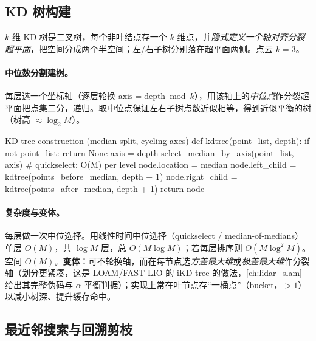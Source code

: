 \subsection{KD 树构建}
\label{sec:pc-kdbuild}

\begin{definition}[KD 树]\label{def:pc-kdtree}
$k$ 维 KD 树是二叉树，每个非叶结点存一个 $k$ 维点，并\emph{隐式定义一个轴对齐分裂超平面}，把空间分成两个半空间；左/右子树分别落在超平面两侧。点云 $k=3$。
\end{definition}

\paragraph{中位数分割建树。}
每层选一个坐标轴（逐层轮换 $\text{axis}=\text{depth}\bmod k$），用该轴上的\emph{中位点}作分裂超平面把点集二分，递归。取中位点保证左右子树点数近似相等，得到近似平衡的树（树高 $\approx\log_2 M$）\cite{bentley1975kdtree}。

\begin{algo}[KD 树建树]\label{alg:pc-kdbuild}
\begin{codebox}[Python]{KD-tree construction (median split, cycling axes)}
def kdtree(point_list, depth):
    if not point_list:
        return None
    axis = depth %
    select_median_by_axis(point_list, axis)   # quickselect: O(M) per level
    node.location   = median
    node.left_child  = kdtree(points_before_median, depth + 1)
    node.right_child = kdtree(points_after_median,  depth + 1)
    return node
\end{codebox}
\end{algo}

\paragraph{复杂度与变体。}
每层做一次中位选择。用线性时间中位选择（quickselect / median-of-medians）单层 $O(M)$，共 $\log M$ 层，总 \textbf{$O(M\log M)$}；若每层排序则 $O(M\log^2 M)$。空间 $O(M)$。\textbf{变体}：可不轮换轴，而在每节点选\emph{方差最大维}或\emph{极差最大维}作分裂轴（划分更紧凑，这是 LOAM/FAST-LIO 的 iKD-tree 的做法，\cref{ch:lidar_slam} 给出其完整伪码与 $\alpha$-平衡判据）；实现上常在叶节点存“一桶点”（bucket，$>1$）以减小树深、提升缓存命中。

\subsection{最近邻搜索与回溯剪枝}
\label{sec:pc-kdnn}


